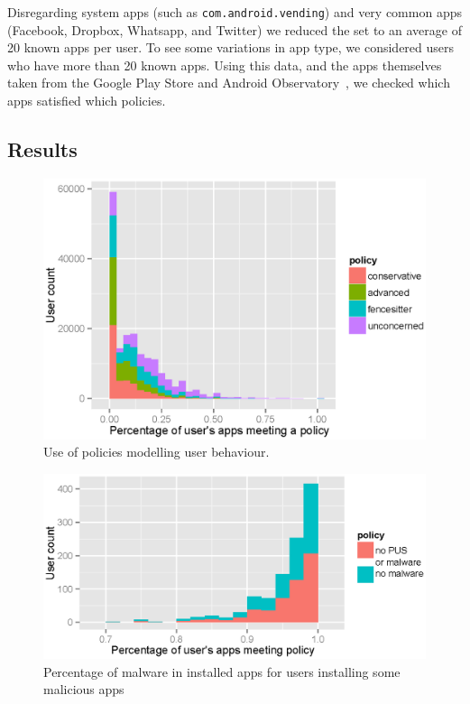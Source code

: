 \documentclass[]{soups-poster}
\newcommand{\citep}[1]{\cite{#1}}
\begin{document}
Disregarding system apps (such as \texttt{com.android.vending}) and very common apps (Facebook, Dropbox, Whatsapp, and Twitter) we reduced the set to an average of 20 known apps per user.
To see some variations in app type, we considered users who have more than 20 known apps.
Using this data, and the apps themselves taken from the Google Play Store and Android Observatory~\citep{Barrera:2012iba}, we checked which apps satisfied which policies.

\subsection{Results}

\begin{figure}[!ht]\centering
  \includegraphics[width=1.0\linewidth]{./tables/lin.eps}
  \caption{Use of policies modelling user behaviour.}
  \label{fig:lin}
\end{figure}

\begin{figure}[!ht]\centering
  \includegraphics[width=1.0\linewidth]{./tables/malware.eps}
  \caption{Percentage of malware in installed apps for users installing some malicious apps}
  \label{fig:malware}
\end{figure}
\end{document}
